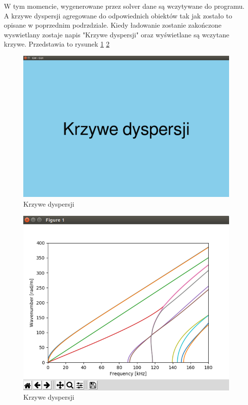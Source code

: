 W tym momencie, wygenerowane przez solver dane są wczytywane do programu. A krzywe dyspersji agregowane do odpowiednich obiektów tak jak zostało to opisane w poprzednim podrzdziale. Kiedy ładowanie zostanie zakończone wyswietlany zostaje napis "Krzywe dyspersji" oraz wyświetlane są wczytane krzywe. Przedstawia to rysunek \ref{fig:gui3} \ref{fig:gui4} 

\begin{figure}[h]
\centering
\includegraphics[width=13cm]{Zdjecia/5/kasia/gui3}
\caption{Krzywe dyspersji}
\label{fig:gui3}
\end{figure}

\begin{figure}[h]
\centering
\includegraphics[width=13cm]{Zdjecia/5/kasia/gui4}
\caption{Krzywe dyspersji}
\label{fig:gui4}
\end{figure}

